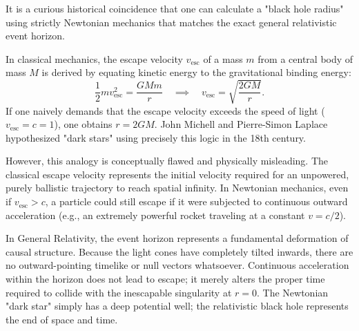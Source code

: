 \documentclass[11pt, a4paper]{report}
\begin{document}
It is a curious historical coincidence that one can calculate a "black hole radius" using strictly Newtonian mechanics that matches the exact general relativistic event horizon. 

In classical mechanics, the escape velocity $v_{\text{esc}}$ of a mass $m$ from a central body of mass $M$ is derived by equating kinetic energy to the gravitational binding energy:
\begin{equation}
\frac{1}{2} m v_{\text{esc}}^{2} = \frac{GMm}{r} \quad \implies \quad v_{\text{esc}} = \sqrt{\frac{2GM}{r}}.
\end{equation}
If one naively demands that the escape velocity exceeds the speed of light ($v_{\text{esc}} = c = 1$), one obtains $r = 2GM$. John Michell and Pierre-Simon Laplace hypothesized "dark stars" using precisely this logic in the 18th century.

However, this analogy is conceptually flawed and physically misleading. The classical escape velocity represents the initial velocity required for an unpowered, purely ballistic trajectory to reach spatial infinity. In Newtonian mechanics, even if $v_{\text{esc}} > c$, a particle could still escape if it were subjected to continuous outward acceleration (e.g., an extremely powerful rocket traveling at a constant $v = c/2$). 

In General Relativity, the event horizon represents a fundamental deformation of causal structure. Because the light cones have completely tilted inwards, there are no outward-pointing timelike or null vectors whatsoever. Continuous acceleration within the horizon does not lead to escape; it merely alters the proper time required to collide with the inescapable singularity at $r=0$. The Newtonian "dark star" simply has a deep potential well; the relativistic black hole represents the end of space and time.
\end{document}
